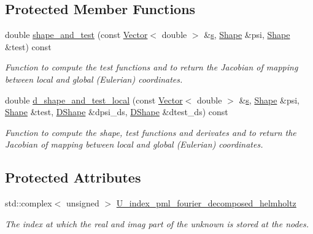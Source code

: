 \subsection*{Protected Member Functions}
\begin{DoxyCompactItemize}
\item 
double \hyperlink{classoomph_1_1PMLFourierDecomposedHelmholtzPowerMonitorElement_a9e879d51e62110b3c59074b5a6497717}{shape\+\_\+and\+\_\+test} (const \hyperlink{classoomph_1_1Vector}{Vector}$<$ double $>$ \&\hyperlink{cfortran_8h_ab7123126e4885ef647dd9c6e3807a21c}{s}, \hyperlink{classoomph_1_1Shape}{Shape} \&psi, \hyperlink{classoomph_1_1Shape}{Shape} \&test) const
\begin{DoxyCompactList}\small\item\em Function to compute the test functions and to return the Jacobian of mapping between local and global (Eulerian) coordinates. \end{DoxyCompactList}\item 
double \hyperlink{classoomph_1_1PMLFourierDecomposedHelmholtzPowerMonitorElement_a43f7cea01ac130a95597e9829ebb4ccc}{d\+\_\+shape\+\_\+and\+\_\+test\+\_\+local} (const \hyperlink{classoomph_1_1Vector}{Vector}$<$ double $>$ \&\hyperlink{cfortran_8h_ab7123126e4885ef647dd9c6e3807a21c}{s}, \hyperlink{classoomph_1_1Shape}{Shape} \&psi, \hyperlink{classoomph_1_1Shape}{Shape} \&test, \hyperlink{classoomph_1_1DShape}{D\+Shape} \&dpsi\+\_\+ds, \hyperlink{classoomph_1_1DShape}{D\+Shape} \&dtest\+\_\+ds) const
\begin{DoxyCompactList}\small\item\em Function to compute the shape, test functions and derivates and to return the Jacobian of mapping between local and global (Eulerian) coordinates. \end{DoxyCompactList}\end{DoxyCompactItemize}
\subsection*{Protected Attributes}
\begin{DoxyCompactItemize}
\item 
std\+::complex$<$ unsigned $>$ \hyperlink{classoomph_1_1PMLFourierDecomposedHelmholtzPowerMonitorElement_a27a8c49d898537496bb067b9b5d5281f}{U\+\_\+index\+\_\+pml\+\_\+fourier\+\_\+decomposed\+\_\+helmholtz}
\begin{DoxyCompactList}\small\item\em The index at which the real and imag part of the unknown is stored at the nodes. \end{DoxyCompactList}\end{DoxyCompactItemize}
